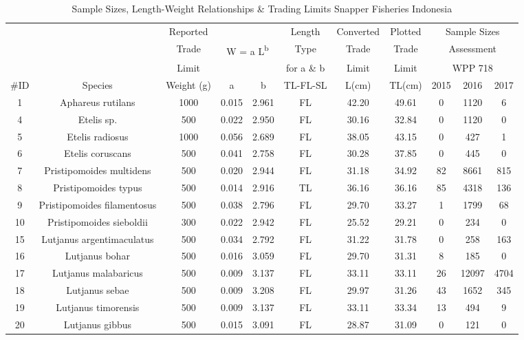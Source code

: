 \documentclass{report}\usepackage[]{graphicx}\usepackage[]{color}
\begin{document}
\begin{table}[ht]
\centering
\caption{Sample Sizes, Length-Weight Relationships \& Trading Limits Snapper Fisheries Indonesia} 
{\small
\begin{tabular}{ccccccccccc}
  \hline
  { } & { } & {Reported} & { } & { } & {Length} & {Converted} & {Plotted} & \multicolumn{3}{c}{Sample Sizes}\\
      { } & { } & {Trade} & \multicolumn{2}{c}{ W = a L\textsuperscript{b}} & {Type} & {Trade} & {Trade} & \multicolumn{3}{c}{Assessment}\\
      { } & { } & {Limit} & { } & { } & {for a \& b} & {Limit} & {Limit} & \multicolumn{3}{c}{WPP 718}\\
      {\#ID} & {Species} & {Weight (g)} & {a} & {b} & {TL-FL-SL} & {L(cm)} & {TL(cm)} & {2015} & {2016} & {2017}\\ \hline
1 & Aphareus rutilans & 1000 & 0.015 & 2.961 & FL & 42.20 & 49.61 & 0 & 1120 & 6 \\ 
  4 & Etelis sp. & 500 & 0.022 & 2.950 & FL & 30.16 & 32.84 & 0 & 1120 & 0 \\ 
  5 & Etelis radiosus & 1000 & 0.056 & 2.689 & FL & 38.05 & 43.15 & 0 & 427 & 1 \\ 
  6 & Etelis coruscans & 500 & 0.041 & 2.758 & FL & 30.28 & 37.85 & 0 & 445 & 0 \\ 
  7 & Pristipomoides multidens & 500 & 0.020 & 2.944 & FL & 31.18 & 34.92 & 82 & 8661 & 815 \\ 
  8 & Pristipomoides typus & 500 & 0.014 & 2.916 & TL & 36.16 & 36.16 & 85 & 4318 & 136 \\ 
  9 & Pristipomoides filamentosus & 500 & 0.038 & 2.796 & FL & 29.70 & 33.27 & 1 & 1799 & 68 \\ 
  10 & Pristipomoides sieboldii & 300 & 0.022 & 2.942 & FL & 25.52 & 29.21 & 0 & 234 & 0 \\ 
  15 & Lutjanus argentimaculatus & 500 & 0.034 & 2.792 & FL & 31.22 & 31.78 & 0 & 258 & 163 \\ 
  16 & Lutjanus bohar & 500 & 0.016 & 3.059 & FL & 29.70 & 31.31 & 8 & 185 & 0 \\ 
  17 & Lutjanus malabaricus & 500 & 0.009 & 3.137 & FL & 33.11 & 33.11 & 26 & 12097 & 4704 \\ 
  18 & Lutjanus sebae & 500 & 0.009 & 3.208 & FL & 29.97 & 31.26 & 43 & 1652 & 345 \\ 
  19 & Lutjanus timorensis & 500 & 0.009 & 3.137 & FL & 33.11 & 33.34 & 13 & 494 & 9 \\ 
  20 & Lutjanus gibbus & 500 & 0.015 & 3.091 & FL & 28.87 & 31.09 & 0 & 121 & 0 \\ 

\end{tabular}}
\end{table}
\end{document}

